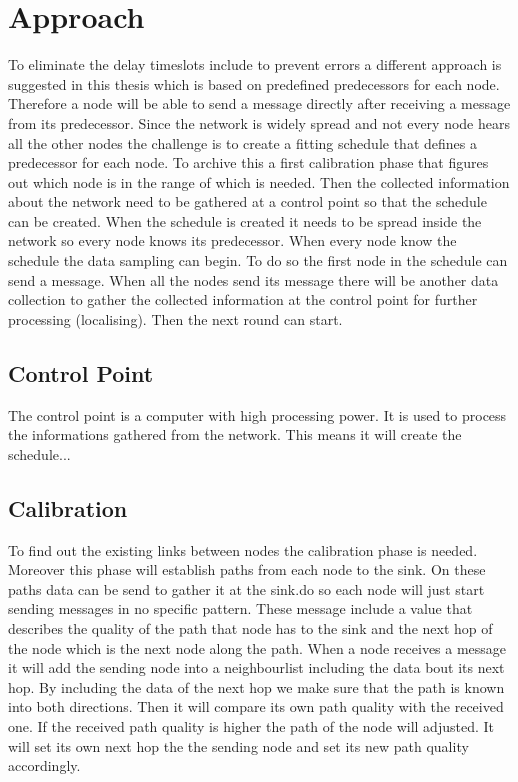 \chapter{Approach}

To eliminate the delay timeslots include to prevent errors a different approach is suggested in this thesis which is based on predefined predecessors for each node. Therefore a node will be able to send a message directly after receiving a message from its predecessor. Since the network is widely spread and not every node hears all the other nodes the challenge is to create a fitting schedule that defines a predecessor for each node. To archive this a first calibration phase that figures out which node is in the range of which is needed. Then the collected information about the network need to be gathered at a control point so that the schedule can be created. When the schedule is created it needs to be spread inside the network so every node knows its predecessor. When every node know the schedule the data sampling can begin. To do so the first node in the schedule can send a message. When all the nodes send its message there will be another data collection to gather the collected information at the control point for further processing (localising). Then the next round can start.

\section{Control Point}
The control point is a computer with high processing power. It is used to process the informations gathered from the network. This means it will create the schedule...
\section{Calibration}
To find out the existing links between nodes the calibration phase is needed. Moreover this phase will establish paths from each node to the sink. On these paths data can be send to gather it at the sink.\nTo do so each node will just start sending messages in no specific pattern. These message include a value that describes the quality of the path that node has to the sink and the next hop of the node which is the next node along the path. When a node receives a message it will add the sending node into a neighbourlist including the data bout its next hop. By including the data of the next hop we make sure that the path is known into both directions. Then it will compare its own path quality with the received one. If the received path quality is higher the path of the node will adjusted. It will set its own next hop the the sending node and set its new path quality accordingly.
